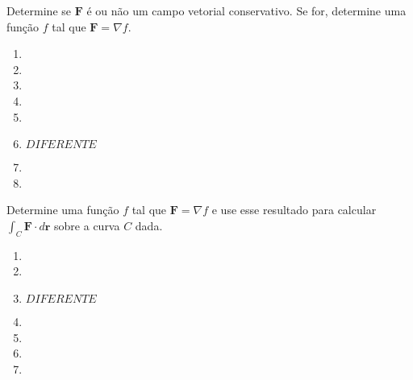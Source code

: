 



	
	
	\vspace{5mm}
	
	Determine se $\textbf{F}$ é ou não um campo vetorial conservativo. Se for, determine uma função $f$ tal que $\textbf{F} = \nabla f$.
	
	\begin{enumerate}
		
		\item
		\resposta{}

		\item
		\resposta{}

		\item
		\resposta{}

		\item
		\resposta{}

		\item
		\resposta{}

		\item $DIFERENTE$

		\item
		\resposta{}
		
		\item
		\resposta{}

	\end{enumerate}
	
	\vspace{5mm}
	
	Determine uma função $f$ tal que $\textbf{F} = \nabla f$ e use esse resultado para calcular $\displaystyle \int_C \textbf{F} \cdot d\textbf{r}$ sobre a curva $C$ dada.
	
	\begin{enumerate}[resume]
	
		\item
		\resposta{}

		\item
		\resposta{}

		\item $DIFERENTE$

		\item
		\resposta{}

		\item
		\resposta{}

		\item
		\resposta{}

		\item
		\resposta{}
	
	\end{enumerate}
	
